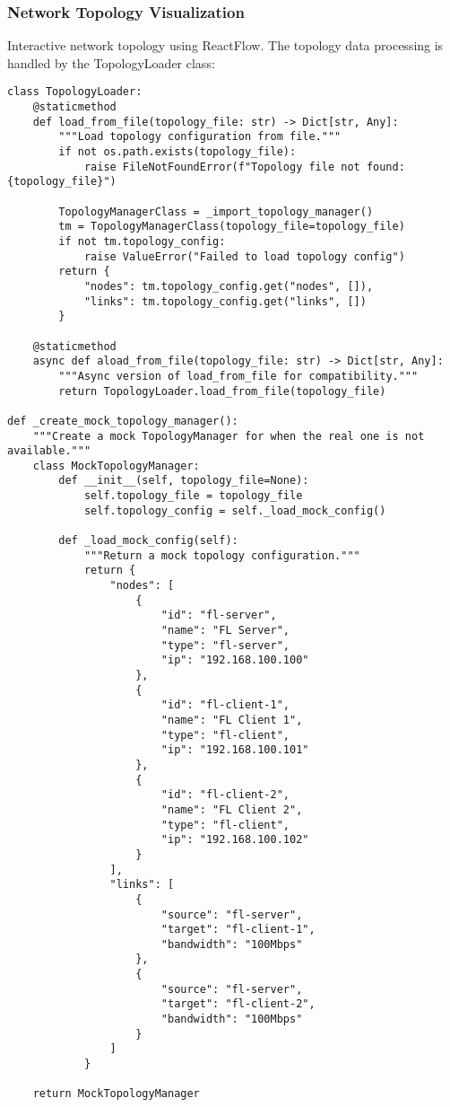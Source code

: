 \subsubsection{Network Topology Visualization}

Interactive network topology using ReactFlow. The topology data processing is handled by the TopologyLoader class:

\begin{lstlisting}[style=pythoncode, caption=Network Topology Data Processing]
class TopologyLoader:
    @staticmethod
    def load_from_file(topology_file: str) -> Dict[str, Any]:
        """Load topology configuration from file."""
        if not os.path.exists(topology_file):
            raise FileNotFoundError(f"Topology file not found: {topology_file}")
        
        TopologyManagerClass = _import_topology_manager()
        tm = TopologyManagerClass(topology_file=topology_file)
        if not tm.topology_config:
            raise ValueError("Failed to load topology config")
        return {
            "nodes": tm.topology_config.get("nodes", []),
            "links": tm.topology_config.get("links", [])
        }

    @staticmethod
    async def aload_from_file(topology_file: str) -> Dict[str, Any]:
        """Async version of load_from_file for compatibility."""
        return TopologyLoader.load_from_file(topology_file)

def _create_mock_topology_manager():
    """Create a mock TopologyManager for when the real one is not available."""
    class MockTopologyManager:
        def __init__(self, topology_file=None):
            self.topology_file = topology_file
            self.topology_config = self._load_mock_config()
        
        def _load_mock_config(self):
            """Return a mock topology configuration."""
            return {
                "nodes": [
                    {
                        "id": "fl-server",
                        "name": "FL Server",
                        "type": "fl-server",
                        "ip": "192.168.100.100"
                    },
                    {
                        "id": "fl-client-1",
                        "name": "FL Client 1",
                        "type": "fl-client",
                        "ip": "192.168.100.101"
                    },
                    {
                        "id": "fl-client-2",
                        "name": "FL Client 2",
                        "type": "fl-client",
                        "ip": "192.168.100.102"
                    }
                ],
                "links": [
                    {
                        "source": "fl-server",
                        "target": "fl-client-1",
                        "bandwidth": "100Mbps"
                    },
                    {
                        "source": "fl-server",
                        "target": "fl-client-2",
                        "bandwidth": "100Mbps"
                    }
                ]
            }
    
    return MockTopologyManager
\end{lstlisting}

